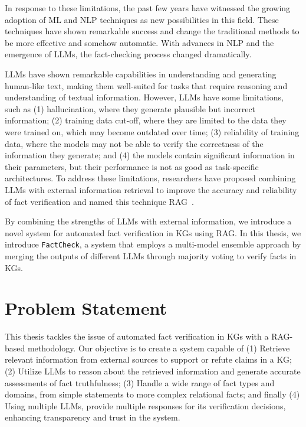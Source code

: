 In response to these limitations, the past few years have witnessed the growing adoption of \ac{ML} and \ac{NLP} techniques as new possibilities in this field.
These techniques have shown remarkable success and change the traditional methods to be more effective and somehow automatic.
With advances in \ac{NLP} and the emergence of \acp{LLM}, the fact-checking process changed dramatically.

\acp{LLM} have shown remarkable capabilities in understanding and generating human-like text, making them well-suited for tasks that require reasoning and understanding of textual information.
However, \acp{LLM} have some limitations, such as (1) hallucination, where they generate plausible but incorrect information;
(2) training data cut-off, where they are limited to the data they were trained on, which may become outdated over time;
(3) reliability of training data, where the models may not be able to verify the correctness of the information they generate;
and (4) the models contain significant information in their parameters, but their performance is not as good as task-specific architectures.
To address these limitations, researchers have proposed combining \acp{LLM} with external information retrieval to improve the accuracy and reliability of fact verification and named this technique \ac{RAG}~\cite{lewis2021retrievalaugmentedgenerationknowledgeintensivenlp}.

By combining the strengths of \acp{LLM} with external information, we introduce a novel system for automated fact verification in \acp{KG} using \ac{RAG}.
In this thesis, we introduce \texttt{FactCheck}, a system that employs a multi-model ensemble approach by merging the outputs of different LLMs through majority voting to verify facts in KGs.

\newpage
\section{Problem Statement}\label{sec:problem}
This thesis tackles the issue of automated fact verification in \acp{KG} with a RAG-based methodology.
Our objective is to create a system capable of
(1) Retrieve relevant information from external sources to support or refute claims in a \ac{KG};
(2) Utilize \acp{LLM} to reason about the retrieved information and generate accurate assessments of fact truthfulness;
(3) Handle a wide range of fact types and domains, from simple statements to more complex relational facts;
and finally (4) Using multiple \acp{LLM}, provide multiple responses for its verification decisions, enhancing transparency and trust in the system.


